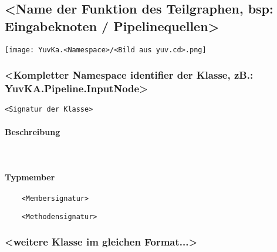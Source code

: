 
\subsection{<Name der Funktion des Teilgraphen, bsp: Eingabeknoten / Pipelinequellen>}
	
\texttt{[image: YuvKa.<Namespace>/<Bild aus yuv.cd>.png]}

\subsubsection{<Kompletter Namespace identifier der Klasse, zB.: YuvKA.Pipeline.InputNode>}

\begin{verbatim}
<Signatur der Klasse>
\end{verbatim}

\paragraph{Beschreibung}~\\

\paragraph{Typmember}
\begin{itemize}

	\begin{verbatim}
	<Membersignatur>
	\end{verbatim}


	\begin{verbatim}
	<Methodensignatur>
	\end{verbatim}


\end{itemize}

\subsubsection{<weitere Klasse im gleichen Format...>}

